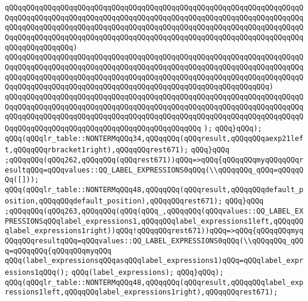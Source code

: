 \verb|qQQqqQQqqQQqqQQqqQQqqQQqqQQqqQQqqQQqqQQqqQQqqQQqqQQqqQQqqQQqqQQqqQQqqQQqqQQqqQQqqQQqqQQqqQQqqQQqqQQqqQQqqQQqqQQqqQQqqQQqqQQqqQQqqQQqqQQqqQQqqQQqqQQqqQQqqQQqqQQqqQQqqQQqqQQqqQQqqQQqqQQqqQQqqQQqqQQqqQQqqQQqqQQqqQQqqQQqqQQqqQQqqQQqqQQqqQQqqQQqqQQqqQQqqQQqqQQqqQQqqQQqqQQqqQQqqQQqqQQqqQQqqQQqqQQqqQQq)|\newline
\verb|qQQqqQQqqQQqqQQqqQQqqQQqqQQqqQQqqQQqqQQqqQQqqQQqqQQqqQQqqQQqqQQqqQQqqQQqqQQqqQQqqQQqqQQqqQQqqQQqqQQqqQQqqQQqqQQqqQQqqQQqqQQqqQQqqQQqqQQqqQQqqQQqqQQqqQQqqQQqqQQqqQQqqQQqqQQqqQQqqQQqqQQqqQQqqQQqqQQqqQQqqQQqqQQqqQQqqQQqqQQqqQQqqQQqqQQqqQQqqQQqqQQqqQQqqQQqqQQqqQQqqQQqqQQqqQQq)|\newline
\verb|qQQqqQQqqQQqqQQqqQQqqQQqqQQqqQQqqQQqqQQqqQQqqQQqqQQqqQQqqQQqqQQqqQQqqQQqqQQqqQQqqQQqqQQqqQQqqQQqqQQqqQQqqQQqqQQqqQQqqQQqqQQqqQQqqQQqqQQqqQQqqQQqqQQqqQQqqQQqqQQqqQQqqQQqqQQqqQQqqQQqqQQqqQQqqQQqqQQqqQQqqQQqqQQqqQQqqQQqqQQqqQQqqQQqqQQqqQQqqQQqqQQqqQQqqQQqqQQq|\newline
\verb|);|\newline
\verb|qQQq}qQQq);|\newline
\verb|qQQq(qQQqlr_table::NONTERMqQQq34,qQQqqQQq(qQQqresult,qQQqqQQqaexp21left,qQQqqQQqrbracket1right),qQQqqQQqrest671);|\newline
\verb|qQQq}qQQq|\newline
\verb|;qQQqqQQq(qQQq262,qQQqqQQq(qQQqrest671))qQQq=>qQQq{qQQqqQQqmyqQQqqQQqresultqQQq=qQQqvalues::QQ_LABEL_EXPRESSIONS0qQQq(\\qQQqqQQq_qQQq=qQQqqQQq([]));|\newline
\verb|qQQq(qQQqlr_table::NONTERMqQQq48,qQQqqQQq(qQQqresult,qQQqqQQqdefault_position,qQQqqQQqdefault_position),qQQqqQQqrest671);|\newline
\verb|qQQq}qQQq|\newline
\verb|;qQQqqQQq(qQQq263,qQQqqQQq(qQQq(qQQq_,qQQqqQQq(qQQqvalues::QQ_LABEL_EXPRESSIONSqQQqlabel_expressions1,qQQqqQQqlabel_expressions1left,qQQqqQQqlabel_expressions1right))qQQq!qQQqqQQqrest671))qQQq=>qQQq{qQQqqQQqmyqQQqqQQqresultqQQq=qQQqvalues::QQ_LABEL_EXPRESSIONS0qQQq(\\qQQqqQQq_qQQq=qQQqqQQq{qQQqqQQqmyqQQq|\newline
\verb|qQQq(label_expressionsqQQqasqQQqlabel_expressions1)qQQq=qQQqlabel_expressions1qQQq();|\newline
\verb|qQQq(label_expressions);|\newline
\verb|qQQq}qQQq);|\newline
\verb|qQQq(qQQqlr_table::NONTERMqQQq48,qQQqqQQq(qQQqresult,qQQqqQQqlabel_expressions1left,qQQqqQQqlabel_expressions1right),qQQqqQQqrest671);|\newline
